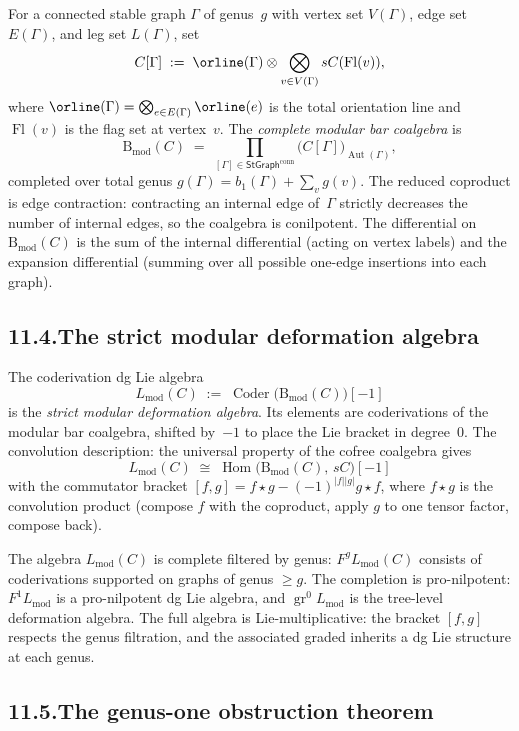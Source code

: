 \documentclass[11pt]{report}
\theoremstyle{definition}
\theoremstyle{remark}
\numberwithin{equation}{section}
\begin{document}
For a connected stable graph $\Gamma$ of genus~$g$ with
vertex set $V(\Gamma)$, edge set $E(\Gamma)$, and leg set
$L(\Gamma)$, set
\[
C[\Gamma]
\;:=\;
\orline(\Gamma)\otimes
\bigotimes_{v\in V(\Gamma)}sC(\operatorname{Fl}(v)),
\]
where $\orline(\Gamma)=\bigotimes_{e\in E(\Gamma)}\orline(e)$
is the total orientation line and $\operatorname{Fl}(v)$ is the
flag set at vertex~$v$. The \emph{complete modular bar coalgebra}
is
\[
\mathrm B_{\mathrm{mod}}(C)
\;=\;
\prod_{[\Gamma]\in\mathsf{StGraph}^{\mathrm{conn}}}
\bigl(C[\Gamma]\bigr)_{\operatorname{Aut}(\Gamma)},
\]
completed over total genus
$g(\Gamma)=b_1(\Gamma)+\sum_{v}g(v)$. The reduced coproduct is
edge contraction: contracting an internal edge of~$\Gamma$
strictly decreases the number of internal edges, so the
coalgebra is conilpotent. The differential on
$\mathrm B_{\mathrm{mod}}(C)$ is the sum of the internal
differential (acting on vertex labels) and the expansion
differential (summing over all possible one-edge insertions into
each graph).

\subsection*{11.4.\enspace The strict modular deformation algebra}

The coderivation dg Lie algebra
\[
L_{\mathrm{mod}}(C)
\;:=\;
\operatorname{Coder}\bigl(\mathrm B_{\mathrm{mod}}(C)\bigr)[-1]
\]
is the \emph{strict modular deformation algebra}. Its elements
are coderivations of the modular bar coalgebra, shifted by~$-1$
to place the Lie bracket in degree~$0$. The convolution
description: the universal property of the cofree coalgebra gives
\[
L_{\mathrm{mod}}(C)
\;\cong\;
\operatorname{Hom}\bigl(\mathrm B_{\mathrm{mod}}(C),\,sC\bigr)[-1]
\]
with the commutator bracket
$[f,g]=f\star g-(-1)^{|f||g|}g\star f$, where
$f\star g$ is the convolution product (compose $f$ with the
coproduct, apply $g$ to one tensor factor, compose back).

The algebra $L_{\mathrm{mod}}(C)$ is complete filtered by genus:
$F^g L_{\mathrm{mod}}(C)$ consists of coderivations supported on
graphs of genus $\ge g$. The completion is pro-nilpotent:
$F^1 L_{\mathrm{mod}}$ is a pro-nilpotent dg Lie algebra, and
$\operatorname{gr}^0 L_{\mathrm{mod}}$ is the tree-level
deformation algebra. The full algebra is Lie-multiplicative:
the bracket $[f,g]$ respects the genus filtration, and the
associated graded inherits a dg Lie structure at each genus.

\subsection*{11.5.\enspace The genus-one obstruction theorem}
\end{document}
